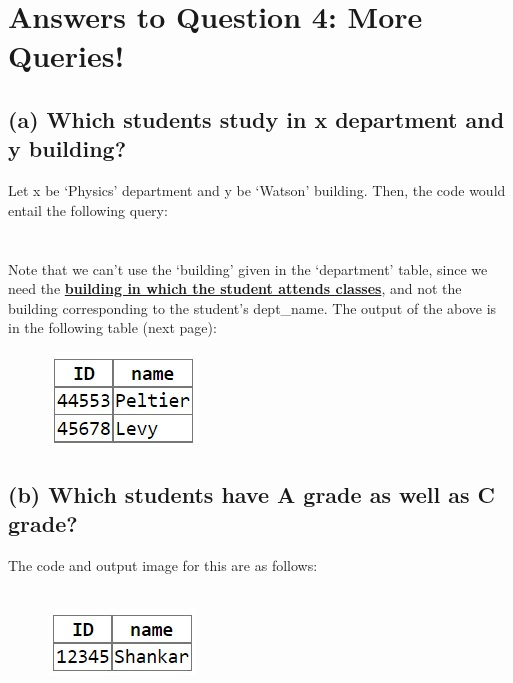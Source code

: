 \documentclass{article}
\begin{document}
\section{Answers to Question 4: More Queries!}
\subsection{(a) Which students study in x department and y building?}
Let x be `Physics' department and y be `Watson' building. Then, the code would entail the following query: \\
{
} \\ \\
Note that we can't use the `building' given in the `department' table, since we need the \underline{\textbf{building in which the student attends classes}}, and not the building corresponding to the student's dept\_name.  The output of the above is in the following table (next page):
\newpage \noindent
\begin{figure}[!hbt]
    \centering
    \includegraphics{pics/q4-pic1.jpg}
    \label{fig:q4p1}
\end{figure}
\subsection{(b) Which students have A grade as well as C grade?}
The code and output image for this are as follows: \\
{
} \\
\begin{figure}[!hbt]
    \centering
    \includegraphics{pics/q4-pic2.jpg}
    \label{fig:q4p2}
\end{figure}
\end{document}
